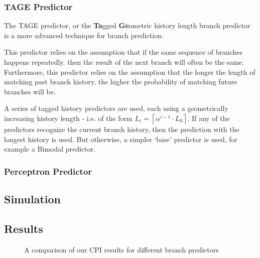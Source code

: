 \subsubsection{TAGE Predictor}
%

The TAGE predictor, or the \textbf{Ta}gged \textbf{Ge}ometric history
length branch predictor is a more advanced technique for branch
prediction.

This predictor relies on the assumption that if the same sequence of
branches happens repeatedly. then the result of the next branch will often
be the same.
Furthermore, this predictor relies on the assumption that the longer
the length of matching past branch history, the higher
the probability of matching future branches will be.\cite{Seznec2006}

A series of tagged history predictors are used, each using a geometrically
increasing history length - i.e. of the form
\(L_i = \left\lceil \alpha^{i-1} \cdot L_0 \right\rceil\).
If any of the predictors recognize the current branch history,
then the prediction with the longest history is used.
But otherwise, a simpler `base' predictor is used, for example a Bimodal
predictor.\cite{Seznec2007}

\subsubsection{Perceptron Predictor}

\subsection{Simulation}

\subsection{Results}

\begin{figure}
    \centering
    
    \caption{A comparison of our CPI results for different branch predictors}
    \label{fig:partd-cpi}
\end{figure}



